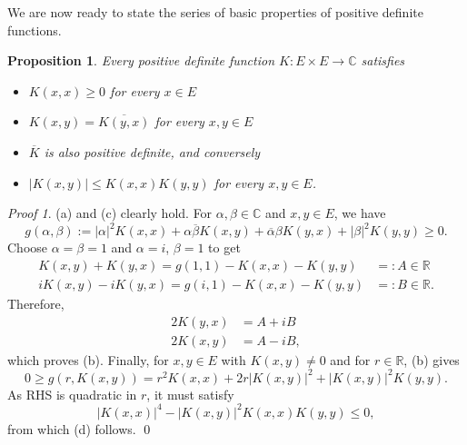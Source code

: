 \documentclass[a4paper,12pt]{article}
\newtheorem{prp}[thm]{Proposition}
\theoremstyle{remark}
\newtheorem*{prf}{Proof}
\theoremstyle{definition}
\theoremstyle{definition}
\theoremstyle{definition}
\newcommand{\abs}[1]{\left| #1 \right|}
\begin{document}
We are now ready to state the series of basic properties of positive definite functions.
\begin{prp}
	Every positive definite function \( K:E \times E \to \mathbb{C} \) satisfies
	\begin{itemize}
		\item[(a)] \( K(x,x) \ge 0 \) for every \( x \in E \)
		\item[(b)] \( K(x,y)=\overline{K(y,x)} \) for every \( x,y \in E \)
		\item[(c)] \( \overline{K} \) is also positive definite, and conversely
		\item[(d)] \( \abs{K(x,y)} \le K(x,x)K(y,y) \) for every \( x,y \in E \).
	\end{itemize}
\end{prp}
\begin{prf}
	(a) and (c) clearly hold. For \( \alpha, \beta \in \mathbb{C} \) and \( x,y \in E \), we have
	\begin{equation*}
		g(\alpha,\beta) := \abs{\alpha}^2 K(x,x) + \alpha \overline{\beta}K(x,y) + \overline{\alpha}\beta K(y,x) + \abs{\beta}^2 K(y,y) \ge 0.
	\end{equation*}
	Choose \( \alpha=\beta=1 \) and \( \alpha = i \), \( \beta=1 \) to get
	\begin{equation*}
		\begin{aligned}
			K(x,y) + K(y,x) = g(1,1) - K(x,x) - K(y,y)     & =: A \in \mathbb{R}  \\
			i K(x,y) - i K(y,x) = g(i,1) - K(x,x) - K(y,y) & =: B \in \mathbb{R}.
		\end{aligned}
	\end{equation*}
	Therefore,
	\begin{equation*}
		\begin{aligned}
			2 K(y,x) & = A + iB  \\
			2 K(x,y) & = A - iB,
		\end{aligned}
	\end{equation*}
	which proves (b). Finally, for \( x,y \in E \) with \( K(x,y) \neq 0 \) and for \( r \in \mathbb{R} \), (b) gives
	\begin{equation*}
		0 \ge g(r,K(x,y)) = r ^2 K(x,x) + 2r \abs{K(x,y)}^2 + \abs{K(x,y)}^2K(y,y).
	\end{equation*}
	As RHS is quadratic in \( r \), it must satisfy
	\begin{equation*}
		\abs{K(x,x)}^4 - \abs{K(x,y)}^2K(x,x)K(y,y) \le 0,
	\end{equation*}
	from which (d) follows.
	\qed\end{prf}
\end{document}
